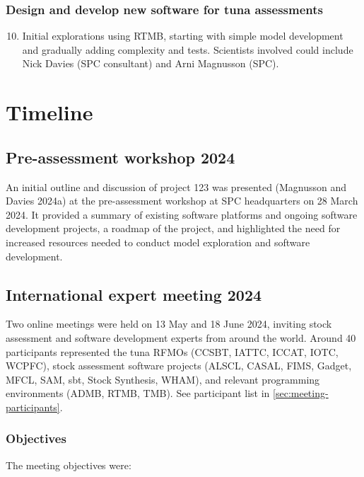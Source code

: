 \documentclass{SCreport}
\begin{document}
\subsubsection{Design and develop new software for tuna assessments}

\begin{enumerate}\setcounter{enumi}{9}
  \item Initial explorations using RTMB, starting with simple model development
  and gradually adding complexity and tests. Scientists involved could include
  Nick Davies (SPC consultant) and Arni Magnusson (SPC).
\end{enumerate}

\section{Timeline}

\subsection{Pre-assessment workshop 2024}

An initial outline and discussion of project 123 was presented (Magnusson and
Davies 2024a) at the pre-assessment workshop at SPC headquarters on 28 March
2024. It provided a summary of existing software platforms and ongoing software
development projects, a roadmap of the project, and highlighted the need for
increased resources needed to conduct model exploration and software
development.

\subsection{International expert meeting 2024}

Two online meetings were held on 13 May and 18 June 2024, inviting stock
assessment and software development experts from around the world. Around 40
participants represented the tuna RFMOs (CCSBT, IATTC, ICCAT, IOTC, WCPFC),
stock assessment software projects (ALSCL, CASAL, FIMS, Gadget, MFCL, SAM, sbt,
Stock Synthesis, WHAM), and relevant programming environments (ADMB, RTMB, TMB).
See participant list in \autoref{sec:meeting-participants}.

\subsubsection{Objectives}

The meeting objectives were:
\end{document}

